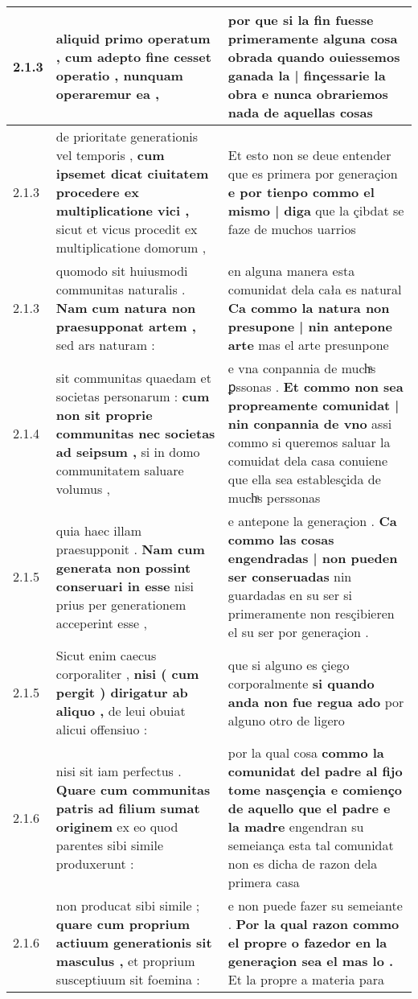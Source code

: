 \begin{tabular}{|p{1cm}|p{6.5cm}|p{6.5cm}|}
2.1.3 & aliquid primo operatum , \textbf{ cum adepto fine cesset operatio , } nunquam operaremur ea , & por que si la fin fuesse primeramente alguna cosa obrada \textbf{ quando ouiessemos ganada la | finçessarie la obra } e nunca obrariemos nada de aquellas cosas \\\hline
2.1.3 & de prioritate generationis vel temporis , \textbf{ cum ipsemet dicat ciuitatem procedere ex multiplicatione vici , } sicut et vicus procedit ex multiplicatione domorum , & Et esto non se deue entender que es primera por generaçion \textbf{ e por tienpo commo el mismo | diga } que la çibdat se faze de muchos uarrios \\\hline
2.1.3 & quomodo sit huiusmodi communitas naturalis . \textbf{ Nam cum natura non praesupponat artem , } sed ars naturam : & en alguna manera esta comunidat dela cała es natural \textbf{ Ca commo la natura non presupone | nin antepone arte } mas el arte presunpone \\\hline
2.1.4 & sit communitas quaedam et societas personarum : \textbf{ cum non sit proprie communitas nec societas ad seipsum , } si in domo communitatem saluare volumus , & e vna conpannia de muchͣs ꝑssonas . \textbf{ Et commo non sea propreamente comunidat | nin conpannia de vno } assi commo si queremos saluar la comuidat dela casa conuiene que ella sea establesçida de muchͣs perssonas \\\hline
2.1.5 & quia haec illam praesupponit . \textbf{ Nam cum generata non possint conseruari in esse } nisi prius per generationem acceperint esse , & e antepone la generaçion . \textbf{ Ca commo las cosas engendradas | non pueden ser conseruadas } nin guardadas en su ser si primeramente non resçibieren el su ser por generaçion . \\\hline
2.1.5 & Sicut enim caecus corporaliter , \textbf{ nisi ( cum pergit ) dirigatur ab aliquo , } de leui obuiat alicui offensiuo : & que si alguno es çiego corporalmente \textbf{ si quando anda non fue regua ado } por alguno otro de ligero \\\hline
2.1.6 & nisi sit iam perfectus . \textbf{ Quare cum communitas patris ad filium sumat originem } ex eo quod parentes sibi simile produxerunt : & por la qual cosa \textbf{ commo la comunidat del padre al fijo tome nasçençia e comienço de aquello que el padre e la madre } engendran su semeiança esta tal comunidat non es dicha de razon dela primera casa \\\hline
2.1.6 & non producat sibi simile ; \textbf{ quare cum proprium actiuum generationis sit masculus , } et proprium susceptiuum sit foemina : & e non puede fazer su semeiante . \textbf{ Por la qual razon commo el propre o fazedor en la generaçion sea el mas lo . } Et la propre a materia para \\\hline

\end{tabular}
